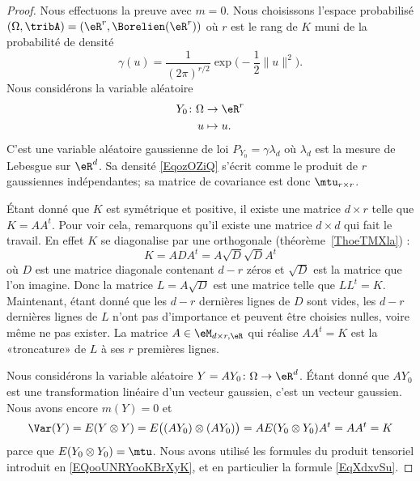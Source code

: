 \begin{proof}
	Nous effectuons la preuve avec \( m=0\). Nous choisissons l'espace probabilisé \( (\Omega,\tribA)=(\eR^r,\Borelien(\eR^r))\) où \( r\) est le rang de \( K\) muni de la probabilité de densité
	\begin{equation}    \label{EqozOZiQ}
		\gamma(u)=\frac{1}{ (2\pi)^{r/2} }\exp\big( -\frac{ 1 }{2}\| u \|^2 \big).
	\end{equation}
	Nous considérons la variable aléatoire
	\begin{equation}
		\begin{aligned}
			Y_0\colon \Omega & \to \eR^r  \\
			u                & \mapsto u.
		\end{aligned}
	\end{equation}
	C'est une variable aléatoire gaussienne de loi \( P_{Y_0}=\gamma\lambda_d\) où \( \lambda_d\) est la mesure de Lebesgue sur \( \eR^d\). Sa densité \eqref{EqozOZiQ} s'écrit comme le produit de \( r\) gaussiennes indépendantes; sa matrice de covariance est donc \( \mtu_{r\times r}\).

	Étant donné que \( K\) est symétrique et positive, il existe une matrice \( d\times r\) telle que \( K=AA^t\). Pour voir cela, remarquons qu'il existe une matrice \( d\times d\) qui fait le travail. En effet \( K\) se diagonalise par une orthogonale (théorème~\ref{ThoeTMXla}) :
	\begin{equation}
		K=ADA^t=A\sqrt{D}\sqrt{D}A^t
	\end{equation}
	où \( D\) est une matrice diagonale contenant \( d-r\) zéros et \( \sqrt{D}\) est la matrice que l'on imagine. Donc la matrice \( L=A\sqrt{D}\) est une matrice telle que \( LL^t=K\). Maintenant, étant donné que les \( d-r\) dernières lignes de \( D\) sont vides, les \( d-r\) dernières lignes de \( L\) n'ont pas d'importance et peuvent être choisies nulles, voire même ne pas exister. La matrice \( A\in\eM_{d\times r,\eR}\) qui réalise \( AA^t=K\) est la «troncature» de \( L\) à ses \( r\) premières lignes.

	Nous considérons la variable aléatoire \( Y=AY_0\colon \Omega\to \eR^d\). Étant donné que \( AY_0\) est une transformation linéaire d'un vecteur gaussien, c'est un vecteur gaussien. Nous avons encore \( m(Y)=0\) et
	\begin{equation}
		\Var(Y)=E(Y\otimes Y)=E\big( (AY_0)\otimes (AY_0) \big)=AE(Y_0\otimes Y_0)A^t=AA^t=K
	\end{equation}
	parce que \( E(Y_0\otimes Y_0)=\mtu\). Nous avons utilisé les formules du produit tensoriel introduit en \eqref{EQooUNRYooKBrXyK}, et en particulier la formule \eqref{EqXdxvSu}.
\end{proof}

